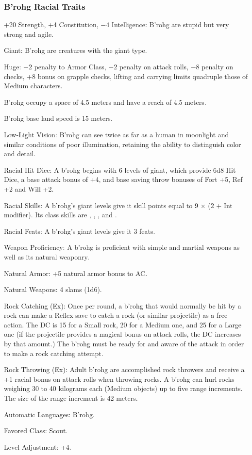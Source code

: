 \subsubsection{B'rohg Racial Traits}
\begin{itemize*}
    \item +20 Strength, +4 Constitution, $-4$ Intelligence: B'rohg are stupid but very strong and agile.
    \item Giant: B'rohg are creatures with the giant type.
    \item Huge: $-2$ penalty to Armor Class, $-2$ penalty on attack rolls, $-8$ penalty on  checks, +8 bonus on grapple checks, lifting and carrying limits quadruple those of Medium characters.
    \item B'rohg occupy a space of 4.5 meters and have a reach of 4.5 meters.
    \item B'rohg base land speed is 15 meters.

    \item Low-Light Vision: B'rohg can see twice as far as a human in moonlight and similar conditions of poor illumination, retaining the ability to distinguish color and detail.

    \item Racial Hit Dice: A b'rohg begins with 6 levels of giant, which provide 6d8 Hit Dice, a base attack bonus of +4, and base saving throw bonuses of Fort +5, Ref +2 and  Will +2.
    \item Racial Skills: A b'rohg's giant levels give it skill points equal to 9 $\times$ (2 + Int modifier). Its class skills are , , , and .
    \item Racial Feats: A b'rohg's giant levels give it 3 feats.
    \item Weapon Proficiency: A b'rohg is proficient with simple and martial weapons as well as its natural weaponry.

    \item Natural Armor: +5 natural armor bonus to AC.
    \item Natural Weapons: 4 slams (1d6).

    \item Rock Catching (Ex): Once per round, a b'rohg that would normally be hit by a rock can make a Reflex save to catch a rock (or similar projectile) as a free action. The DC is 15 for a Small rock, 20 for a Medium one, and 25 for a Large one (if the projectile provides a magical bonus on attack rolls, the DC increases by that amount.) The b'rohg must be ready for and aware of the attack in order to make a rock catching attempt.
    \item Rock Throwing (Ex): Adult b'rohg are accomplished rock throwers and receive a +1 racial bonus on attack rolls when throwing rocks. A b'rohg can hurl rocks weighing 30 to 40 kilograms each (Medium objects) up to five range increments. The size of the range increment is 42 meters.

    \item Automatic Languages: B'rohg.
    \item Favored Class: Scout.
    \item Level Adjustment: +4.
\end{itemize*}
